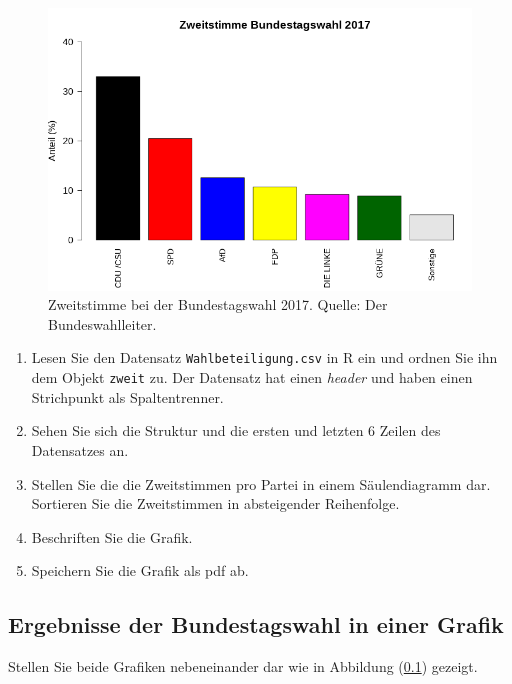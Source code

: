 \documentclass[]{book}
\providecommand{\tightlist}{%
  \setlength{\itemsep}{0pt}\setlength{\parskip}{0pt}}
\begin{document}
\begin{figure}
\includegraphics[width=1\linewidth]{Zweitstimme} \caption{Zweitstimme bei der Bundestagswahl 2017. Quelle: Der Bundeswahlleiter.}\label{fig:zweitstimme}
\end{figure}

\begin{enumerate}
\def\labelenumi{\arabic{enumi}.}
\tightlist
\item
  Lesen Sie den Datensatz \texttt{Wahlbeteiligung.csv} in R ein und ordnen Sie ihn dem Objekt \texttt{zweit} zu. Der Datensatz hat einen \emph{header} und haben einen Strichpunkt als Spaltentrenner.
\item
  Sehen Sie sich die Struktur und die ersten und letzten 6 Zeilen des Datensatzes an.
\item
  Stellen Sie die die Zweitstimmen pro Partei in einem Säulendiagramm dar. Sortieren Sie die Zweitstimmen in absteigender Reihenfolge.
\item
  Beschriften Sie die Grafik.
\item
  Speichern Sie die Grafik als pdf ab.
\end{enumerate}

\hypertarget{zweigrafiken}{%
\subsection{Ergebnisse der Bundestagswahl in einer Grafik}\label{zweigrafiken}}

Stellen Sie beide Grafiken nebeneinander dar wie in Abbildung (\ref{zweigrafiken}) gezeigt.
\end{document}

